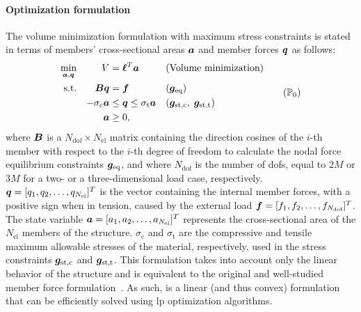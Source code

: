 \paragraph{Optimization formulation}
The volume minimization formulation with maximum stress constraints is stated in terms of members' cross-sectional areas $\bm{a}$ and member forces $\bm{q}$ as follows:
\begin{equation}
    \begin{aligned}
    \min_{\vect{a}, \vect{q}}   && V &= \vect{\ell}^{T}\vect{a} && \textrm{(Volume minimization)}\\
    \textrm{s.t.}   && \matr{B}\vect{q} &= \vect{f} && (\vect{g}_\text{eq})\\
    && -\sigma_\text{c}\vect{a} &\leq \vect{q} \leq \sigma_\text{t}\vect{a} && (\vect{g}_\text{st,c}, \; \vect{g}_\text{st,t}) \\
    && \vect{a} &\geq 0, \\
    \end{aligned}
    \tag{$\mathbb{P}_0$}
    \label{eq:02_optim_original}
\end{equation}
where $\bm{B}$ is a $N_{\text{dof}} \times N_{\text{el}}$ matrix containing the direction cosines of the $i$-th member with respect to the $i$-th degree of freedom to calculate the nodal force equilibrium constraints $\bm{g}_\text{eq}$, and where $N_{\text{dof}}$ is the number of \gls{dofs}, equal to $2M$ or $3M$ for a two- or a three-dimensional load case, respectively. $\bm{q} = [q_1, q_2, \ldots,q_{N_{\text{el}}}]^T$ is the vector containing the internal member forces, with a positive sign when in tension, caused by the external load $\bm{f} = [f_1, f_2, \ldots,f_{N_{\text{dof}}}]^T$. The state variable $\bm{a} = [a_1, a_2, \ldots,a_{N_{\text{el}}}]^T$ represents the cross-sectional area of the $N_{\text{el}}$ members of the structure. $\sigma_\text{c}$ and $\sigma_\text{t}$ are the compressive and tensile maximum allowable stresses of the material, respectively, used in the stress constraints $\bm{g}_\text{st,c}$ and $\bm{g}_\text{st,t}$. This formulation takes into account only the linear behavior of the structure and is equivalent to the original and well-studied member force formulation~. As such,  is a linear (and thus convex) formulation that can be efficiently solved using \gls{lp} optimization algorithms.

